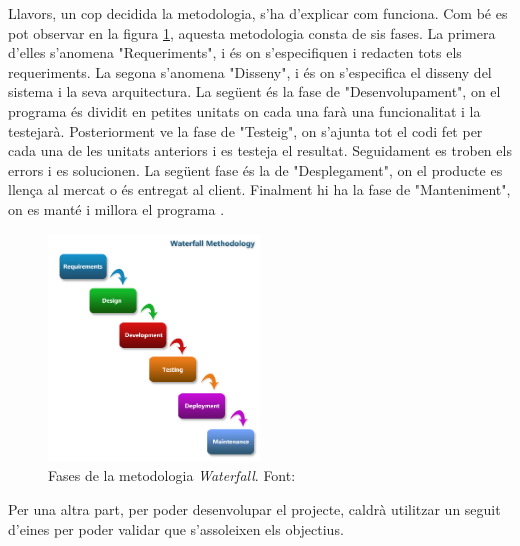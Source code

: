 \documentclass[a4paper]{article}
\begin{document}
Llavors, un cop decidida la metodologia, s'ha d'explicar com funciona. Com bé es pot observar en la figura \ref{fig:WaterfallImage}, aquesta metodologia consta de sis fases. La primera d'elles s'anomena "Requeriments", i és on s'especifiquen i redacten tots els requeriments. La segona s'anomena "Disseny", i és on s'especifica el disseny del sistema i la seva arquitectura. La següent és la fase de "Desenvolupament", on el programa és dividit en petites unitats on cada una farà una funcionalitat i la testejarà. Posteriorment ve la fase de "Testeig", on s'ajunta tot el codi fet per cada una de les unitats anteriors i es testeja el resultat. Seguidament es troben els errors i es solucionen. La següent fase és la de "Desplegament", on el producte es llença al mercat o és entregat al client. Finalment hi ha la fase de "Manteniment", on es manté i millora el programa \cite{waterfallImage}. 

\begin{figure}[H]
    \centering
    \includegraphics[width=0.5\textwidth]{images/Waterfall-Metodology.png}
    \caption{Fases de la metodologia \textit{Waterfall}. Font: \cite{waterfallImage}}
    \label{fig:WaterfallImage}
\end{figure}

Per una altra part, per poder desenvolupar el projecte, caldrà utilitzar un seguit d'eines per poder validar que s'assoleixen els objectius. 
\end{document}
